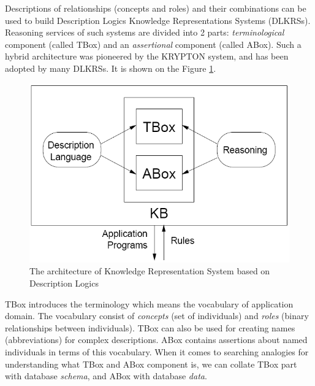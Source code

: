 Descriptions of relationships (concepts and roles) and their combinations can be used to build Description Logics Knowledge Representations Systems (DLKRSs). Reasoning services of such systems are divided into 2 parts: \textit{terminological} component (called TBox) and an \textit{assertional} component (called ABox). Such a hybrid architecture was pioneered by the KRYPTON system, and has been adopted by many DLKRSs. It is shown on the Figure \ref{fig:DLSystemArchitecture}.

\newpage

\begin{figure}[htp]
\centering
\includegraphics[scale=0.6]{images/chapter2/DLSystemArchitecture}
\caption{The architecture of Knowledge Representation System based on Description Logics \cite{BCM03}}
\label{fig:DLSystemArchitecture}
\end{figure}

\noindent TBox introduces the terminology which means the vocabulary of application domain. The vocabulary consist of \textit{concepts} (set of individuals) and \textit{roles} (binary relationships between individuals). TBox can also be used for creating names (abbreviations) for complex descriptions. ABox contains assertions about named individuals in terms of this vocabulary. When it comes to searching analogies for understanding what TBox and ABox component is, we can collate TBox part with database \textit{schema}, and ABox with database \textit{data}.

